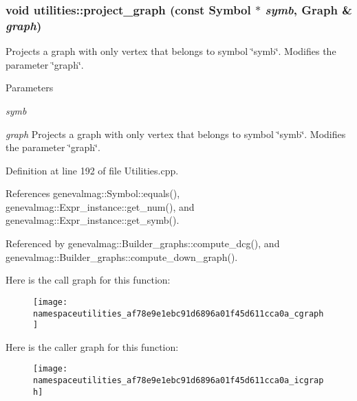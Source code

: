 \hypertarget{namespaceutilities_af78e9e1ebc91d6896a01f45d611cca0a}{
\subsubsection[{project\_\-graph}]{\setlength{\rightskip}{0pt plus 5cm}void utilities::project\_\-graph (const {\bf Symbol} $\ast$ {\em symb}, \/  Graph \& {\em graph})}}
\label{namespaceutilities_af78e9e1ebc91d6896a01f45d611cca0a}
Projects a graph with only vertex that belongs to symbol \char`\"{}symb\char`\"{}. Modifies the parameter \char`\"{}graph\char`\"{}. 
\begin{DoxyParams}{Parameters}
\item[{\em symb}]\item[{\em graph}]Projects a graph with only vertex that belongs to symbol \char`\"{}symb\char`\"{}. Modifies the parameter \char`\"{}graph\char`\"{}. \end{DoxyParams}


Definition at line 192 of file Utilities.cpp.



References genevalmag::Symbol::equals(), genevalmag::Expr\_\-instance::get\_\-num(), and genevalmag::Expr\_\-instance::get\_\-symb().



Referenced by genevalmag::Builder\_\-graphs::compute\_\-dcg(), and genevalmag::Builder\_\-graphs::compute\_\-down\_\-graph().



Here is the call graph for this function:\nopagebreak
\begin{figure}[H]
\begin{center}
\leavevmode
\texttt{[image: namespaceutilities\_af78e9e1ebc91d6896a01f45d611cca0a\_cgraph]}
\end{center}
\end{figure}




Here is the caller graph for this function:\nopagebreak
\begin{figure}[H]
\begin{center}
\leavevmode
\texttt{[image: namespaceutilities\_af78e9e1ebc91d6896a01f45d611cca0a\_icgraph]}
\end{center}
\end{figure}


